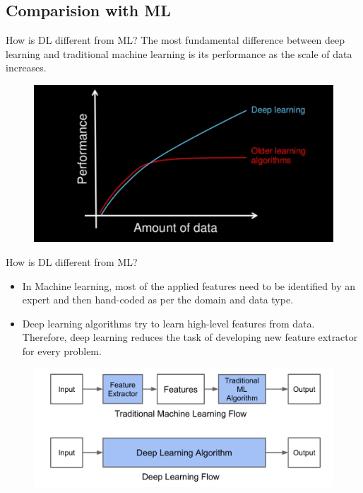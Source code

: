 \documentclass[10pt]{beamer}
\begin{document}
	\subsection{Comparision with ML}
	\begin{frame}{How is DL different from ML?}
		\large{The most fundamental difference between deep learning and
		traditional machine learning is its performance as the scale of
		data increases.}
		\begin{figure}
			\includegraphics[width=\linewidth]{images/whydl}
		\end{figure}
	\end{frame}
	\begin{frame}{How is DL different from ML?}
		\large{\begin{itemize}
				\item<1> In Machine learning, most of the applied features need to be
				identified by an expert and then hand-coded as per the domain
				and data type.
				\item<2> Deep learning algorithms try to learn high-level
				features from data. Therefore, deep learning reduces the task
				of developing new feature extractor for every problem.
				\end{itemize}
		}
	 	\begin{figure}
	 		\includegraphics[width=\linewidth]{images/featureengg}
	 	\end{figure}
	\end{frame}
\end{document}
